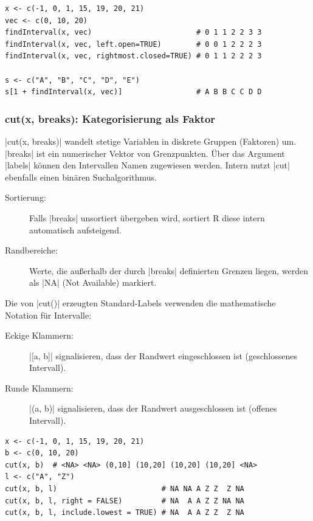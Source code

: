 \documentclass[10pt,twocolumn]{scrartcl}
\renewcommand{\lstinline}{\mycoloredinline}
\begin{document}
\begin{lstlisting}
x <- c(-1, 0, 1, 15, 19, 20, 21)
vec <- c(0, 10, 20)
findInterval(x, vec)                        # 0 1 1 2 2 3 3
findInterval(x, vec, left.open=TRUE)        # 0 0 1 2 2 2 3
findInterval(x, vec, rightmost.closed=TRUE) # 0 1 1 2 2 2 3

s <- c("A", "B", "C", "D", "E")
s[1 + findInterval(x, vec)]                 # A B B C C D D
\end{lstlisting}

\subsubsection{cut(x, breaks): Kategorisierung als Faktor}

\lstinline|cut(x, breaks)| wandelt stetige Variablen in diskrete Gruppen (Faktoren) um. \lstinline|breaks| ist ein numerischer Vektor von Grenzpunkten. Über das Argument \lstinline|labels| können den Intervallen Namen zugewiesen werden. Intern nutzt \lstinline|cut| ebenfalls einen binären Suchalgorithmus.

\begin{description}
\item[Sortierung:] Falls \lstinline|breaks| unsortiert übergeben wird, sortiert R diese intern automatisch aufsteigend.
\item[Randbereiche:] Werte, die außerhalb der durch \lstinline|breaks| definierten Grenzen liegen, werden als \lstinline|NA| (Not Available) markiert.
\end{description}

Die von \lstinline|cut()| erzeugten Standard-Labels verwenden die mathematische Notation für Intervalle:

\begin{description}
\item[Eckige Klammern:] \lstinline|[a, b]| signalisieren, dass der Randwert eingeschlossen ist (geschlossenes Intervall).
\item[Runde Klammern:] \lstinline|(a, b)| signalisieren, dass der Randwert ausgeschlossen ist (offenes Intervall).
\end{description}

\begin{lstlisting}
x <- c(-1, 0, 1, 15, 19, 20, 21)
b <- c(0, 10, 20)
cut(x, b)  # <NA> <NA> (0,10] (10,20] (10,20] (10,20] <NA>
l <- c("A", "Z")
cut(x, b, l)                        # NA NA A Z Z  Z NA
cut(x, b, l, right = FALSE)         # NA  A A Z Z NA NA
cut(x, b, l, include.lowest = TRUE) # NA  A A Z Z  Z NA
\end{lstlisting}
\end{document}
